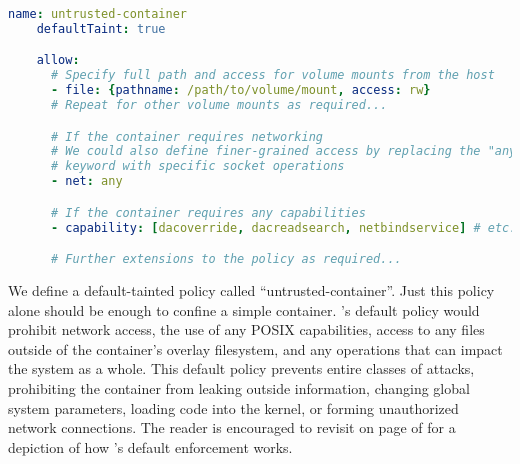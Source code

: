 
\begin{lstlisting}[language=yaml, gobble=4,
  caption={[Confining an untrusted container with \bpfcontain{}]
    Confining an untrusted container with \bpfcontain{}.
    Note that this policy requires some extensions on top of the existing \bpfcontain{}
    model, such as instrumenting the Docker container runtime.
  },
  label={lst:bpfcontain-untrusted}, float=false]
    name: untrusted-container
    defaultTaint: true

    allow:
      # Specify full path and access for volume mounts from the host
      - file: {pathname: /path/to/volume/mount, access: rw}
      # Repeat for other volume mounts as required...

      # If the container requires networking
      # We could also define finer-grained access by replacing the "any"
      # keyword with specific socket operations
      - net: any

      # If the container requires any capabilities
      - capability: [dacoverride, dacreadsearch, netbindservice] # etc.

      # Further extensions to the policy as required...
\end{lstlisting}

We define a default-tainted \bpfcontain{} policy called \enquote{untrusted-container}.
Just this policy alone should be enough to confine a simple container. \bpfcontain{}'s
default policy would prohibit network access, the use of any POSIX capabilities, access to
any files outside of the container's overlay filesystem, and any operations that can
impact the system as a whole. This default policy prevents entire classes of attacks,
prohibiting the container from leaking outside information, changing global system
parameters, loading code into the kernel, or forming unauthorized network connections. The
reader is encouraged to revisit  on page
\pageref{fig:bpfcontain-enforcement} of  for a depiction of how
\bpfcontain{}'s default enforcement works.

